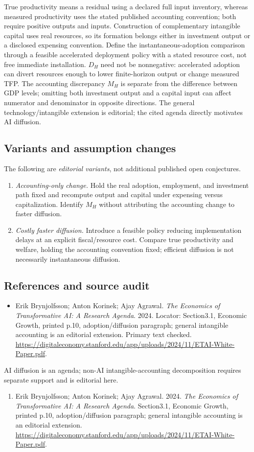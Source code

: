 \documentclass[11pt,a4paper]{article}
\begin{document}
True productivity means a residual using a declared full input inventory, whereas measured productivity uses the stated published accounting convention; both require positive outputs and inputs. Construction of complementary intangible capital uses real resources, so its formation belongs either in investment output or a disclosed expensing convention. Define the instantaneous-adoption comparison through a feasible accelerated deployment policy with a stated resource cost, not free immediate installation. \(D_H\) need not be nonnegative: accelerated adoption can divert resources enough to lower finite-horizon output or change measured TFP. The accounting discrepancy \(M_H\) is separate from the difference between GDP levels; omitting both investment output and a capital input can affect numerator and denominator in opposite directions. The general technology/intangible extension is editorial; the cited agenda directly motivates AI diffusion.
\subsection*{Variants and assumption changes}
The following are \emph{editorial variants}, not additional published open conjectures.
\begin{enumerate}
\item \emph{Accounting-only change.} Hold the real adoption, employment, and investment path fixed and recompute output and capital under expensing versus capitalization. Identify \(M_H\) without attributing the accounting change to faster diffusion.
\item \emph{Costly faster diffusion.} Introduce a feasible policy reducing implementation delays at an explicit fiscal/resource cost. Compare true productivity and welfare, holding the accounting convention fixed; efficient diffusion is not necessarily instantaneous diffusion.
\end{enumerate}
\subsection*{References and source audit}
\begin{itemize}
\item Erik Brynjolfsson; Anton Korinek; Ajay Agrawal. \emph{The Economics of Transformative AI: A Research Agenda}. 2024. Locator: Section3.1, Economic Growth, printed p.10, adoption/diffusion paragraph; general intangible accounting is an editorial extension. Primary text checked. \url{https://digitaleconomy.stanford.edu/app/uploads/2024/11/ETAI-White-Paper.pdf}.
\end{itemize}
AI diffusion is an agenda; non-AI intangible-accounting decomposition requires separate support and is editorial here.
\begin{enumerate}\raggedright
\item\hypertarget{definitions:source:30007545:1}{} Erik Brynjolfsson; Anton Korinek; Ajay Agrawal. 2024. \emph{The Economics of Transformative AI: A Research Agenda}. Section3.1, Economic Growth, printed p.10, adoption/diffusion paragraph; general intangible accounting is an editorial extension.
\url{https://digitaleconomy.stanford.edu/app/uploads/2024/11/ETAI-White-Paper.pdf}.
\end{enumerate}
\end{document}
